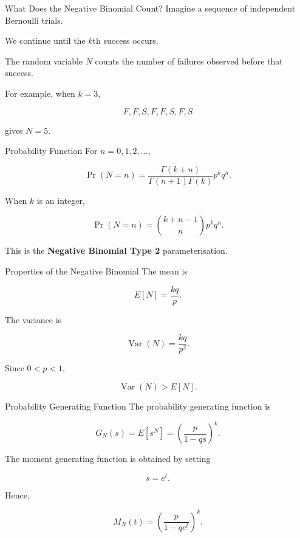 \documentclass[
  ignorenonframetext,
  aspectratio=169,
]{beamer}
\begin{document}
\begin{frame}{What Does the Negative Binomial Count?}
\protect{}\label{what-does-the-negative-binomial-count}
Imagine a sequence of independent Bernoulli trials.

We continue until the \(k\)th success occurs.

The random variable \(N\) counts the number of failures observed before
that success.

For example, when \(k=3\),

\[
F,F,S,F,F,S,F,S
\]

gives \(N=5\).
\end{frame}

\begin{frame}{Probability Function}
\protect{}\label{probability-function}
For \(n=0,1,2,\ldots\),

\[
\Pr(N=n)
=
\frac{\Gamma(k+n)}
{\Gamma(n+1)\Gamma(k)}
p^kq^n.
\]

When \(k\) is an integer,

\[
\Pr(N=n)
=
\binom{k+n-1}{n}p^kq^n.
\]

This is the \textbf{Negative Binomial Type 2} parameterisation.
\end{frame}

\begin{frame}{Properties of the Negative Binomial}
\protect{}\label{properties-of-the-negative-binomial}
The mean is

\[
E[N]=\frac{kq}{p}.
\]

The variance is

\[
\operatorname{Var}(N)=\frac{kq}{p^2}.
\]

Since \(0<p<1\),

\[
\operatorname{Var}(N)>E[N].
\]
\end{frame}

\begin{frame}{Probability Generating Function}
\protect{}\label{probability-generating-function}
The probability generating function is

\[
G_N(s)
=
E[s^N]
=
\left(\frac{p}{1-qs}\right)^k.
\]

The moment generating function is obtained by setting

\[
s=e^t.
\]

Hence,

\[
M_N(t)
=
\left(\frac{p}{1-qe^t}\right)^k.
\]
\end{frame}
\end{document}
